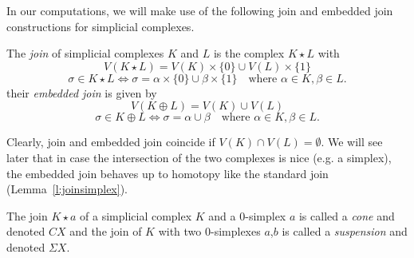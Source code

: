 \documentclass[a4paper, v2021]{lipics-v2021}
\theoremstyle{plain}
\theoremstyle{definition}
\newcommand{\AD}{\mathrm{AD}}{}
\newcommand{\Cliq}[2]{\mathsf{Cliq}_{#1}(#2)}
\begin{document}



In our computations, we will make use of the following join and embedded join constructions for simplicial complexes.
\begin{definition}\label{d:join}
The \emph{join} of simplicial complexes $K$ and $L$ is the complex $K \star L$ with
$$V(K \star L) = V(K)\times \{0\} \cup V(L)\times\{1\}$$
$$\sigma \in K \star L \iff \sigma = \alpha\times\{0\} \cup \beta\times\{1\} \quad \text{where } \alpha \in K, \beta \in L.$$
their \emph{embedded join} is given by
$$V(K \oplus L) = V(K) \cup V(L)$$
$$\sigma \in K \oplus L \iff \sigma = \alpha \cup \beta \quad \text{where } \alpha \in K, \beta \in L.$$
\end{definition}
Clearly, join and embedded join coincide if $V(K) \cap V(L) = \emptyset$. We will see later that in case the intersection of the two complexes is nice (e.g. a simplex), the embedded join behaves up to homotopy like the standard join (Lemma~\ref{l:joinsimplex}).

 The join $K\star a$ of a simplicial complex $K$ and a $0$-simplex $a$ is called a \emph{cone} and denoted $CX$ and the join of $K$ with two $0$-simplexes $a$,$b$ is called a \emph{suspension} and denoted $\Sigma X$.

\end{document}
